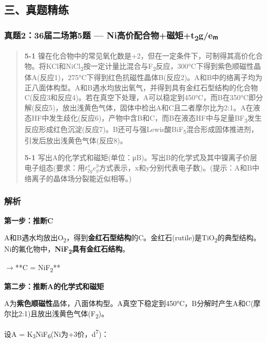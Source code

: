 \documentclass[a4paper,11pt]{ctexart}
\newcommand{\箭}{\ensuremath{\rightarrow}}
\newcommand{\左箭}{\ensuremath{\leftarrow}}
\newcommand{\上箭}{\ensuremath{\uparrow}}
\newcommand{\下箭}{\ensuremath{\downarrow}}
\newcommand{\衡}{\ensuremath{\rightleftharpoons}}
\newcommand{\双箭}{\ensuremath{\leftrightarrow}}
\newcommand{\约等于}{\ensuremath{\approx}}
\newcommand{\小于等于}{\ensuremath{\leq}}
\newcommand{\大于等于}{\ensuremath{\geq}}
\newcommand{\不等于}{\ensuremath{\neq}}
\newcommand{\西格马}{\ensuremath{\sigma}}
\newcommand{\派}{\ensuremath{\pi}}
\begin{document}
\subsection{三、真题精练}\label{ux4e09ux771fux9898ux7cbeux7ec3-4}

\subsubsection{\texorpdfstring{真题2：36届二场第5题 --- Ni高价配合物+磁矩+t\textsubscript{2}g/eₘ}{真题2：36届二场第5题 --- Ni高价配合物+磁矩+t2g/eₘ}}\label{ux771fux9898236ux5c4aux4e8cux573aux7b2c5ux9898-niux9ad8ux4ef7ux914dux5408ux7269ux78c1ux77e9t2geux2098}

\begin{quote}
\textbf{5-1} 镍在化合物中的常见氧化数是+2，但在一定条件下，可制得其高价化合物。将KCl和NiCl\textsubscript{2}按一定计量比混合与F\textsubscript{2}反应，300°C下得到紫色顺磁性晶体A(反应1)，275°C下得到红色抗磁性晶体B(反应2)。A和B中的络离子均为正八面体构型。A和B遇水均放出氧气，并得到具有金红石型结构的化合物C(反应3和反应4)。若在真空下处理，A可以稳定到450°C，而B在350°C即分解(反应5)，放出浅黄色气体，固体中检出A和C且二者摩尔比为2:1。A在液态HF中发生歧化(反应6)，产物中含B和C，而B在液态HF中与足量BF\textsubscript{3}发生反应形成红色沉淀(反应7)。B还可与强Lewis酸BiF\textsubscript{5}混合形成固体推进剂，引发后放出浅黄色气体(反应8)。

\textbf{5-1} 写出A的化学式和磁矩(单位：μB)。写出B的化学式及其中镍离子价层电子组态(要求：用\(t_{2g}^{x}e_{g}^{y}\)方式表示，x和y分别代表电子数)。(提示：A和B中络离子的晶体场分裂能近似相等。)
\end{quote}

\subsubsection{解析}\label{ux89e3ux6790-20}

\textbf{第一步：推断C}

A和B遇水均放出O\textsubscript{2}，得到\textbf{金红石型结构}的C。金红石(rutile)是TiO\textsubscript{2}的典型结构。Ni的氟化物中，\textbf{NiF\textsubscript{2}具有金红石结构}。

\箭 **C = NiF\textsubscript{2}**

\textbf{第二步：推断A的化学式和磁矩}

A为\textbf{紫色顺磁性}晶体，八面体构型。A真空下稳定到450°C，B分解时产生A和C(摩尔比2:1)且放出浅黄色气体(F\textsubscript{2})。

设A = K\textsubscript{3}NiF\textsubscript{6}(Ni为+3价，d\textsuperscript{7})：
\end{document}
